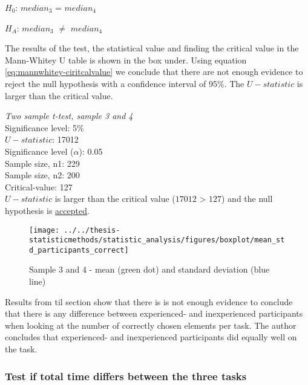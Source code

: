 \centerline{$H_{0}$: $median_3$ = $median_4$}
\centerline{$H_{A}$: $median_3$ $\neq$ $median_4$}

The results of the test, the statistical value and finding the critical value in the Mann-Whitey U table is shown in the box under. Using equation \ref{eq:mannwhitey-ciritcalvalue} we conclude that there are not enough evidence to reject the null hypothesis with a confidence interval of 95\%. The $U-statistic$ is larger than the critical value. 

 \begin{center}
	\begin{tcolorbox}[width=0.8\textwidth]
		\centering
		\textit{Two sample t-test, sample 3 and 4}\\
		Significance level: 5\%  \\[0.5cm]
		
		$U-statistic$: 17012 \\
		Significance level ($\alpha$): 0.05 \\
		Sample size, n1:  229\\
		Sample size, n2: 200\\
		Critical-value: 127 \\[0.2cm] %
		
		$U-statistic$ is larger than the critical value ($17012$ > $127$) and the null hypothesis is \underline{accepted}.\\[0.5cm]
	\end{tcolorbox} 
\end{center}

\begin{figure}[H]
	\centering
	\texttt{[image: ../../thesis-statisticmethods/statistic\_analysis/figures/boxplot/mean\_std\_participants\_correct]}
	\caption{Sample 3 and 4 - mean (green dot) and standard deviation (blue line)}
	\label{fig:meanstdparticipantscorrect}
\end{figure}

Results from til section show that there is is not enough evidence to conclude that there is any difference between experienced- and inexperienced participants when looking at the number of correctly chosen elements per task. The author concludes that experienced- and inexperienced participants did equally well on the task. 

\subsubsection[Sample 5, 6 and 7]{Test if total time differs between the three tasks}\label{sec:anova_result} %

